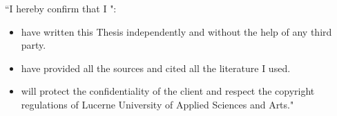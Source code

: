 ``I hereby confirm that I \underline{\hspace{10cm}}":
\begin{itemize}
    \item have written this Thesis independently and without the help of any third party.
    \item have provided all the sources and cited all the literature I used.
    \item will protect the confidentiality of the client and respect the copyright regulations of Lucerne University of Applied Sciences and Arts."
\end{itemize}